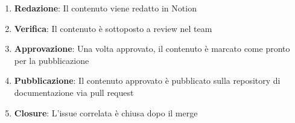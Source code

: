 \begin{enumerate}
  \item \textbf{Redazione}: Il contenuto viene redatto in Notion
  \item \textbf{Verifica}: Il contenuto è sottoposto a review nel team
  \item \textbf{Approvazione}: Una volta approvato, il contenuto è marcato come pronto per la pubblicazione
  \item \textbf{Pubblicazione}: Il contenuto approvato è pubblicato sulla repository di documentazione via pull request
  \item \textbf{Closure}: L'issue correlata è chiusa dopo il merge
\end{enumerate}

